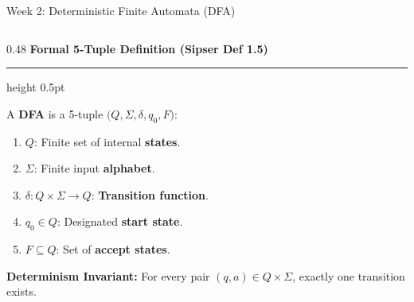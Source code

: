 \documentclass[aspectratio=169, 10pt]{beamer}
\newcommand{\colheader}[1]{%
  {\noindent\footnotesize\bfseries\color{gimpanavy}#1}%
  \vspace{0.03cm}%
  {\color{gimpanavy!30}\hrule height 0.5pt}%
  \vspace{0.08cm}%
}
\begin{document}
\begin{frame}{Week 2: Deterministic Finite Automata (DFA)}
  \begin{columns}[T]
    \begin{column}{0.48\textwidth}
      \colheader{Formal 5-Tuple Definition (Sipser Def 1.5)}
      \begin{tcolorbox}[conceptcard]
        \footnotesize
        A \textbf{DFA} is a 5-tuple $\bigl(Q, \Sigma, \delta, q_0, F\bigr)$:
        \begin{enumerate}\setlength{\itemsep}{2pt}
          \item $Q$: Finite set of internal \textbf{states}.
          \item $\Sigma$: Finite input \textbf{alphabet}.
          \item $\delta: Q \times \Sigma \to Q$: \textbf{Transition function}.
          \item $q_0 \in Q$: Designated \textbf{start state}.
          \item $F \subseteq Q$: Set of \textbf{accept states}.
        \end{enumerate}
      \end{tcolorbox}
      \vspace{0.05cm}
      \begin{tcolorbox}[examplecard]
        \scriptsize
        \textbf{Determinism Invariant:} For every pair $(q, a) \in Q \times \Sigma$, exactly one transition exists.
      \end{tcolorbox}
    \end{column}

    \hfill


\end{columns}
\end{frame}
\end{document}
